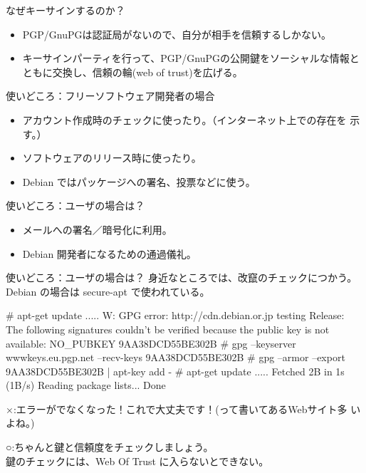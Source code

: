 \frame{\titlepage{}}

\begin{frame}{なぜキーサインするのか？}
\begin{itemize}
\item PGP/GnuPGは認証局がないので、自分が相手を信頼するしかない。
\item キーサインパーティを行って、PGP/GnuPGの公開鍵をソーシャルな情報とともに交換し、信頼の輪(web of
 trust)を広げる。
\end{itemize}
\end{frame}

\begin{frame}{使いどころ：フリーソフトウェア開発者の場合}
\begin{itemize}
\item アカウント作成時のチェックに使ったり。（インターネット上での存在を
      示す。）
\item ソフトウェアのリリース時に使ったり。
\item Debian ではパッケージへの署名、投票などに使う。
\end{itemize}
\end{frame}

\begin{frame}[containsverbatim]{使いどころ：ユーザの場合は？}
\begin{itemize}
\item メールへの署名／暗号化に利用。
\item Debian 開発者になるための通過儀礼。
\end{itemize}
\end{frame}

\begin{frame}[containsverbatim]{使いどころ：ユーザの場合は？}
身近なところでは、改竄のチェックにつかう。
Debian の場合は secure-apt で使われている。
\begin{commandline}
# apt-get update
.....
W: GPG error: http://cdn.debian.or.jp testing Release: The following
 signatures couldn't be verified because the public key is not
 available: NO_PUBKEY 9AA38DCD55BE302B
# gpg --keyserver wwwkeys.eu.pgp.net --recv-keys 9AA38DCD55BE302B
# gpg --armor --export 9AA38DCD55BE302B | apt-key add -
# apt-get update
.....
Fetched 2B in 1s (1B/s)
Reading package lists... Done
\end{commandline}
×:エラーがでなくなった！これで大丈夫です！(って書いてあるWebサイト多
 いよね。)

○:ちゃんと鍵と信頼度をチェックしましょう。\\
鍵のチェックには、Web Of Trust に入らないとできない。
\end{frame}

